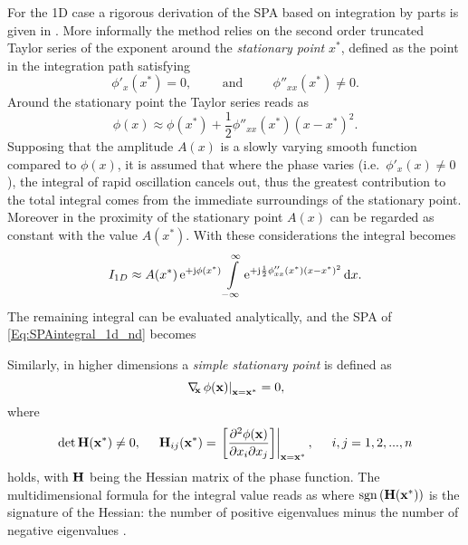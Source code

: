 For the 1D case a rigorous derivation of the SPA based on integration by parts is given in \cite{Bleistein1984, Blenstein1975, Williams1999}.
More informally the method relies on the second order truncated Taylor series of the exponent around the \emph{stationary point} $x^*$, defined as the point in the integration path satisfying 
\begin{equation}
\phi'_x(x^*) = 0, \hspace{1cm} \text{and} \hspace{1cm} \phi''_{xx}(x^*) \neq 0.
\end{equation}
Around the stationary point the Taylor series reads as
\begin{equation}
\phi(x) \approx \phi(x^*) + \frac{1}{2}\phi''_{xx}(x^*)(x-x^*)^2.
\end{equation}
%
Supposing that the amplitude $A(x)$ is a slowly varying smooth function compared to $\phi(x)$, it is assumed that where the phase varies (i.e.\ $\phi'_x(x) \neq 0$), the integral of rapid oscillation cancels out, thus the greatest contribution to the total integral comes from the immediate surroundings of the stationary point.
Moreover in the proximity of the stationary point $A(x)$ can be regarded as constant with the value $A(x^*)$.
%
With these considerations the integral becomes
\begin{align}
I_{1D} \approx A(x^*)\,\mathrm{e}^{+\mathrm{j}\phi(x^*)} 
\int\limits_{-\infty}^{\infty} \mathrm{e}^{+\mathrm{j} \frac{1}{2}\phi''_{xx}(x^*)(x-x^*)^2} \, \mathrm{d} x.
\end{align}
The remaining integral can be evaluated analytically, and the SPA of \eqref{Eq:SPAintegral_1d_nd} becomes \cite[Ch.\ 2.8]{Blenstein1975}

Similarly, in higher dimensions a \emph{simple stationary point} is defined as
\begin{equation}
\label{Eq:ndim_stat_point}
\left.
\nabla_{\!\!\mathbf{x}}\, \phi(\mathbf{x})\right|_{\mathbf{x} = \mathbf{x}^*} = 0,
\end{equation}
where 
\begin{equation}
\det \mathbf{H}(\mathbf{x}^*) \neq 0,
\hspace{5mm} 
\mathbf{H}_{ij}(\mathbf{x}^*) = \left. \left[
\frac{\partial^2 \phi(\mathbf{x})}{\partial x_i \partial x_j} 
\right] \right|_{\mathbf{x} = \mathbf{x}^*},
\hspace{5mm}
i,j = 1,2,...,n
\end{equation}
holds, with $\mathbf{H}$ being the Hessian matrix of the phase function.
The multidimensional formula for the integral value reads as
where $\mathrm{sgn}\left( \mathbf{H}(\mathbf{x}^*) \right)$ is the signature of the Hessian: the number of positive eigenvalues minus the number of negative eigenvalues \cite{Bleistein2000}.

